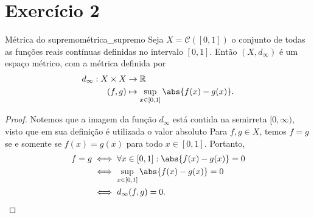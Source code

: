 \section*{Exercício 2}
\begin{proposition}{Métrica do supremo}{métrica_supremo}
    Seja \(X = \mathcal{C}([0,1])\) o conjunto de todas as funções reais contínuas definidas no intervalo \([0,1]\). Então \((X, d_\infty)\) é um espaço métrico, com a métrica definida por
    \begin{align*}
        d_\infty : X \times X &\to \mathbb{R}\\
                        (f,g) &\mapsto \sup_{x \in [0,1]} \abs{f(x) - g(x)}.
    \end{align*}
\end{proposition}
\begin{proof}
    Notemos que a imagem da função \(d_\infty\) está contida na semirreta \([0,\infty)\), visto que em sua definição é utilizada o valor absoluto
    Para \(f,g \in X\), temos \(f = g\) se e somente se \(f(x) = g(x)\) para todo \(x \in [0,1]\). Portanto,
    \begin{align*}
        f = g &\iff \forall x \in [0,1] : \abs{f(x) - g(x)} = 0\\
              &\iff \sup_{x \in [0,1]}  \abs{f(x) - g(x)} = 0\\
              &\iff d_\infty(f,g) = 0.
    \end{align*}
\end{proof}
